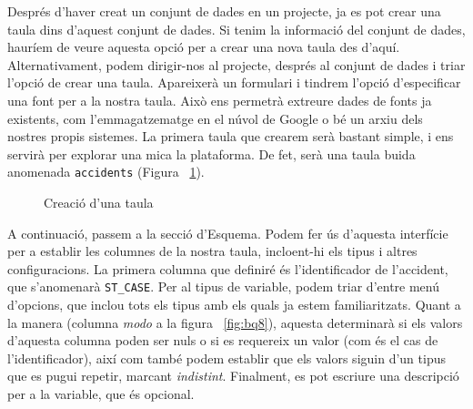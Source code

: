 \documentclass[12pt,longbibliography]{article}
\theoremstyle{definition}
\theoremstyle{remark}
\begin{document}
Després d'haver creat un conjunt de dades en un projecte, ja es pot crear una taula dins d'aquest conjunt de dades. Si tenim la informació del conjunt de dades, hauríem de veure aquesta opció per a crear una nova taula des d'aquí. Alternativament, podem dirigir-nos al projecte, després al conjunt de dades i triar l'opció de crear una taula. Apareixerà un formulari i tindrem l'opció d'especificar una font per a la nostra taula. Això ens permetrà extreure dades de fonts ja existents, com l'emmagatzematge en el núvol de Google o bé un arxiu dels nostres propis sistemes. La primera taula que crearem serà bastant simple, i ens servirà per explorar una mica la plataforma. De fet, serà una taula buida anomenada \verb|accidents| (Figura ~\ref{fig:bq6}). 

\vspace{2mm}
\begin{figure}[h!]
\par
{}%
\hfill
{}%
\par
\caption{Creació d'una taula}
\label{fig:bq6}
\end{figure}
\vspace{2mm}

A continuació, passem a la secció d'Esquema. Podem fer ús d'aquesta interfície per a establir les columnes de la nostra taula, incloent-hi els tipus i altres configuracions. La primera columna que definiré és l'identificador de l'accident, que s'anomenarà \verb|ST_CASE|. Per al tipus de variable, podem triar d'entre menú d'opcions, que inclou tots els tipus amb els quals ja estem familiaritzats. Quant a la manera (columna \textit{modo} a la figura ~\ref{fig:bq8}), aquesta determinarà si els valors d'aquesta columna poden ser nuls o si es requereix un valor (com és el cas de l'identificador), així com també podem establir que els valors siguin d'un tipus que es pugui repetir, marcant \textit{indistint}. Finalment, es pot escriure una descripció per a la variable, que és opcional. 
\end{document}
